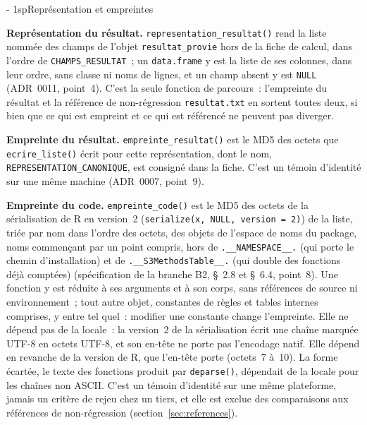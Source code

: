 \documentclass[a4paper,11pt]{article}
\makeatletter
\newcommand{\titrebandeau}[1]{%
  \noindent{\color{financeblue}\rule{\linewidth}{2.5pt}}
  \par\vspace{5mm}
  {\color{greenline}\raggedright\fontsize{19}{23}\bfseries\selectfont #1\par}
  \vspace{6mm}}
\newcommand{\charte@bandeau}[1]{%
  \parindent\z@ \everypar{\strut}%
  {\strut\par}\nobreak
  \titrebandeau{#1}\nobreak
  \kern\z@\nobreak\strut\par}
\newcommand{\charte@reserve}[1]{\par\ifinner\else\if@nobreak\else
  \penalty\z@ %
  \begingroup\setlength{\dimen@}{#1}%
  \dimen@ii\pagegoal \advance\dimen@ii-\pagetotal
  \ifdim\pagegoal=\maxdimen\else\ifdim\dimen@>\dimen@ii
    \vfil\penalty-\@M %
  \fi\fi\endgroup\fi\fi}
\renewcommand{\section}{\charte@reserve{12\baselineskip}%
  \@startsection{section}{1}{\z@}%
  {\z@}{1sp}{\normalfont\charte@bandeau}}
\newcommand{\code}[1]{\texttt{\small #1}}
\makeatother
\begin{document}
\section{Représentation et empreintes}
\label{sec:rapport-empreintes}

\textbf{Représentation du résultat.} \code{representation\_resultat()}
rend la liste nommée des champs de l'objet \code{resultat\_provie} hors de
la fiche de calcul, dans l'ordre de \code{CHAMPS\_RESULTAT}~; un
\code{data.frame} y est la liste de ses colonnes, dans leur ordre, sans
classe ni noms de lignes, et un champ absent y est \code{NULL} (ADR~0011,
point~4). C'est la seule fonction de parcours~: l'empreinte du résultat et
la référence de non-régression \code{resultat.txt} en sortent toutes deux,
si bien que ce qui est empreint et ce qui est référencé ne peuvent pas
diverger.

\textbf{Empreinte du résultat.} \code{empreinte\_resultat()} est le MD5 des
octets que \code{ecrire\_liste()} écrit pour cette représentation, dont le
nom, \code{REPRESENTATION\_CANONIQUE}, est consigné dans la fiche. C'est un
témoin d'identité sur une même machine (ADR~0007, point~9).

\textbf{Empreinte du code.} \code{empreinte\_code()} est le MD5 des octets
de la sérialisation de R en version~2 (\code{serialize(x, NULL, version =
2)}) de la liste, triée par nom dans l'ordre des octets, des objets de
l'espace de noms du package, noms commençant par un point compris, hors de
\code{.\_\_NAMESPACE\_\_.} (qui porte le chemin d'installation) et de
\code{.\_\_S3MethodsTable\_\_.} (qui double des fonctions déjà comptées)
(spécification de la branche B2, §~2.8 et §~6.4, point~8). Une fonction y
est réduite à ses arguments et à son corps, sans références de source ni
environnement~; tout autre objet, constantes de règles et tables internes
comprises, y entre tel quel~: modifier une constante change l'empreinte.
Elle ne dépend pas de la locale~: la version~2 de la sérialisation écrit une
chaîne marquée UTF-8 en octets UTF-8, et son en-tête ne porte pas
l'encodage natif. Elle dépend en revanche de la version de R, que l'en-tête
porte (octets~7 à~10). La forme écartée, le texte des fonctions produit par
\code{deparse()}, dépendait de la locale pour les chaînes non ASCII. C'est
un témoin d'identité sur une même plateforme, jamais un critère de rejeu
chez un tiers, et elle est exclue des comparaisons aux références de
non-régression (section~\ref{sec:references}).
\end{document}
